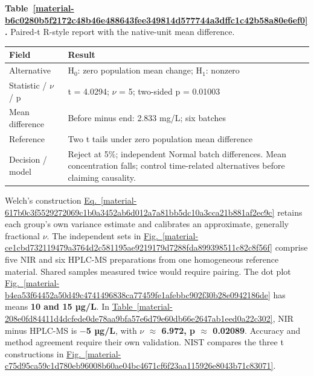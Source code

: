 \documentclass[11pt,a4paper]{article}
\newcounter{scripttable}
\begin{document}
\par\medskip
{}
\label{material-b6c0280b5f2172c48b46e488643fee349814d577744a3dffc1c42b58a80e6ef0}
\noindent\textbf{Table~\ref*{material-b6c0280b5f2172c48b46e488643fee349814d577744a3dffc1c42b58a80e6ef0}.} Paired-t R-style report with the native-unit mean difference.\par\nopagebreak
\begin{longtable}{@{}p{}p{}@{}}
Field & Result \\ \hline
\endhead
Alternative & H\ensuremath{{}_0}: zero population mean change; H\ensuremath{{}_1}: nonzero \\ \hline
Statistic / \ensuremath{\nu} / p & t = 4.0294; \ensuremath{\nu} = 5; two-sided p = 0.01003 \\ \hline
Mean difference & Before minus end: 2.833 mg/L; six batches \\ \hline
Reference & Two t tails under zero population mean difference \\ \hline
Decision / model & Reject at 5\%; independent Normal batch differences. Mean concentration falls; control time-related alternatives before claiming causality. \\ \hline
\end{longtable}
\medskip

Welch's construction \hyperref[material-617b0c3f5529272069c1b0a3452ab6d012a7a81bb5dc10a3cca21b881af2ec9c]{Eq.~\ref*{material-617b0c3f5529272069c1b0a3452ab6d012a7a81bb5dc10a3cca21b881af2ec9c}} retains each group's own variance estimate and calibrates an approximate, generally fractional \textbf{\ensuremath{\nu}}. The independent sets in \hyperref[material-ce1cbd732119479a3764d2c581195ae9219179d7288fda899398511c82c8f56f]{Fig.~\ref*{material-ce1cbd732119479a3764d2c581195ae9219179d7288fda899398511c82c8f56f}} comprise five NIR and six HPLC-MS preparations from one homogeneous reference material. Shared samples measured twice would require pairing. The dot plot \hyperref[material-b4ea53f64452a50d49c4741496838ca77459fe1afebbc902f30b28e0942186de]{Fig.~\ref*{material-b4ea53f64452a50d49c4741496838ca77459fe1afebbc902f30b28e0942186de}} has means \textbf{10 and 15 µg/L}. In \hyperref[material-208e0fd84411d4dcfede0de78aa9bfa57e6d79e60db66e2647ab1eed0a22c302]{Table~\ref*{material-208e0fd84411d4dcfede0de78aa9bfa57e6d79e60db66e2647ab1eed0a22c302}}, NIR minus HPLC-MS is \textbf{\ensuremath{-}5 µg/L}, with \textbf{\ensuremath{\nu} \ensuremath{\approx} 6.972, p \ensuremath{\approx} 0.02089}. Accuracy and method agreement require their own validation. NIST compares the three t constructions in \hyperref[material-c75d95ca59c1d780eb96008b60ae04bc4671cf6f23aa115926e8043b71c83071]{Fig.~\ref*{material-c75d95ca59c1d780eb96008b60ae04bc4671cf6f23aa115926e8043b71c83071}}.
\end{document}
